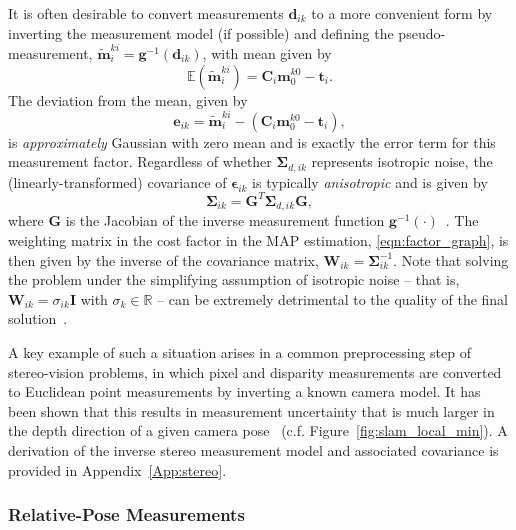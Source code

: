 \documentclass[lettersize,journal]{IEEEtran}
\begin{document}
It is often desirable to convert measurements $ \bm{d}_{ik} $ to a more convenient form by inverting the measurement model (if possible) and defining the pseudo-measurement, $\tilde{\bm{m}}_i^{ki} = \bm{g}^{-1}(\bm{d}_{ik})$, with mean given by
\begin{equation*}
	\mathbb{E}(\tilde{\bm{m}}_i^{ki})=\bm{C}_i\bm{m}_0^{k0} - \bm{t}_i.
\end{equation*} 
The deviation from the mean, given by
\begin{equation}\label{eqn:lm_error_term}
	\bm{e}_{ik} = \tilde{\bm{m}}_i^{ki} - (\bm{C}_i\bm{m}_0^{k0} - \bm{t}_i),
\end{equation}
is \emph{approximately} Gaussian with zero mean and is exactly the error term for this measurement factor. Regardless of whether $ \bm{\Sigma}_{d,ik} $ represents isotropic noise, the (linearly-transformed) covariance of $\bm{\epsilon}_{ik} $ is typically \textit{anisotropic} and is given by
\begin{equation}
	\bm{\Sigma}_{ik} = \bm{G}^T \bm{\Sigma}_{d,ik} \bm{G},
\end{equation}
where $\bm{G}$ is the Jacobian of the inverse measurement function $\bm{g}^{-1}(\cdot)$~\cite{matthiesErrorModelingStereo1987}. 
The weighting matrix in the cost factor in the MAP estimation, \eqref{eqn:factor_graph}, is then given by the inverse of the covariance matrix, $ \bm{W}_{ik} = \bm{\Sigma}^{-1}_{ik} $. Note that solving the problem under the simplifying assumption of isotropic noise -- that is, $ \bm{W}_{ik} = \sigma_{ik} \bm{I}$ with $ \sigma_k \in \mathbb{R}$ -- can be extremely detrimental to the quality of the final solution~\cite{matthiesErrorModelingStereo1987,maimoneTwoYearsVisual2007}. 

A key example of such a situation arises in a common preprocessing step of stereo-vision problems, in which pixel and disparity measurements are converted to Euclidean point measurements by inverting a known camera model.  It has been shown that this results in measurement uncertainty that is much larger in the depth direction of a given camera pose~\cite{matthiesErrorModelingStereo1987,barfootPoseEstimationUsing2011} (c.f. Figure~\ref{fig:slam_local_min}). A derivation of the inverse stereo measurement model and associated covariance is provided in Appendix~\ref{App:stereo}. 

\subsubsection{Relative-Pose Measurements}\label{sec:RelPoseMeas}
\end{document}
